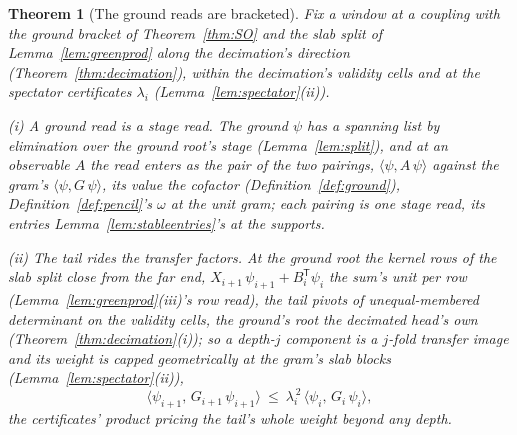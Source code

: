 \documentclass[11pt]{article}
\newtheorem{theorem}{Theorem}
\theoremstyle{definition}
\begin{document}
\begin{theorem}[The ground reads are bracketed]\label{thm:groundreads}
Fix a window at a coupling with the ground bracket of
Theorem~\ref{thm:SO} and the slab split of
Lemma~\ref{lem:greenprod} along the decimation's direction
(Theorem~\ref{thm:decimation}), within the decimation's validity cells and at
the spectator certificates $\lambda_i$
(Lemma~\ref{lem:spectator}(ii)).

\emph{(i) A ground read is a stage read.} The ground $\psi$ has a
spanning list by elimination over the ground root's stage
(Lemma~\ref{lem:split}), and at an observable $A$ the read
enters as the pair of the two pairings,
$\langle\psi,A\,\psi\rangle$ against the gram's
$\langle\psi,G\,\psi\rangle$, its value the cofactor
(Definition~\ref{def:ground}),
Definition~\ref{def:pencil}'s $\omega$ at the unit gram; each
pairing is one stage read, its entries
Lemma~\ref{lem:stableentries}'s at the supports.

\emph{(ii) The tail rides the transfer factors.} At the ground root
the kernel rows of the slab split close from the far end,
$X_{i+1}\,\psi_{i+1}+B_i^{\mathsf T}\psi_i$ the sum's unit per row
(Lemma~\ref{lem:greenprod}(iii)'s row read), the tail pivots of
unequal-membered determinant on the validity cells, the ground's root the decimated
head's own (Theorem~\ref{thm:decimation}(i)); so a depth-$j$ component is
a $j$-fold transfer image and its weight is capped geometrically at
the gram's slab blocks (Lemma~\ref{lem:spectator}(ii)),
\[
\langle\psi_{i+1},\,G_{i+1}\,\psi_{i+1}\rangle\ \le\
\lambda_i^{\,2}\,\langle\psi_i,\,G_i\,\psi_i\rangle ,
\]
the certificates' product pricing the tail's whole weight beyond
any depth.


\end{theorem}
\end{document}
